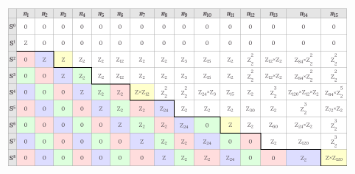 \documentclass[UKenglish]{beamer}
\begin{document}
\begin{frame}
\begin{figure}[]
    \centering
    \includegraphics[width=0.8\textwidth]{figures/homotopigrupper.png}
    \label{fig:}
\end{figure}
\end{frame}
\end{document}
